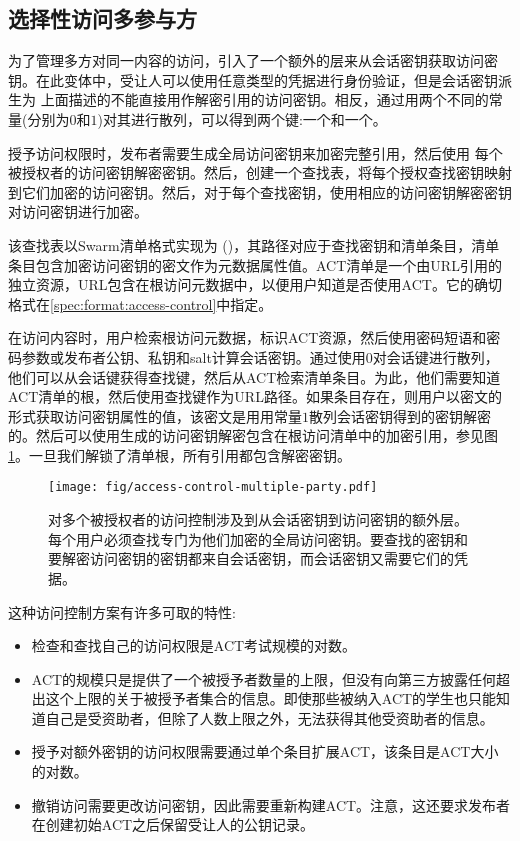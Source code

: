 \subsection{选择性访问多参与方\statusgreen}

为了管理多方对同一内容的访问，引入了一个额外的层来从会话密钥获取访问密钥。在此变体中，受让人可以使用任意类型的凭据进行身份验证，但是会话密钥派生为
上面描述的不能直接用作解密引用的访问密钥。相反，通过用两个不同的常量(分别为$0$和$1$)对其进行散列，可以得到两个键:一个和一个。

授予访问权限时，发布者需要生成全局访问密钥来加密完整引用，然后使用
每个被授权者的访问密钥解密密钥。然后，创建一个查找表，将每个授权查找密钥映射到它们加密的访问密钥。然后，对于每个查找密钥，使用相应的访问密钥解密密钥对访问密钥进行加密。

该查找表以Swarm清单格式实现为 ()，其路径对应于查找密钥和清单条目，清单条目包含加密访问密钥的密文作为元数据属性值。ACT清单是一个由URL引用的独立资源，URL包含在根访问元数据中，以便用户知道是否使用ACT。它的确切格式在\ref{spec:format:access-control}中指定。

在访问内容时，用户检索根访问元数据，标识ACT资源，然后使用密码短语和密码参数或发布者公钥、私钥和salt计算会话密钥。通过使用$0$对会话键进行散列，他们可以从会话键获得查找键，然后从ACT检索清单条目。为此，他们需要知道ACT清单的根，然后使用查找键作为URL路径。如果条目存在，则用户以密文的形式获取访问密钥属性的值，该密文是用用常量$1$散列会话密钥得到的密钥解密的。然后可以使用生成的访问密钥解密包含在根访问清单中的加密引用，参见图\ref{fig:access-control-multiple-party}。一旦我们解锁了清单根，所有引用都包含解密密钥。

\begin{figure}[htbp]
\centering
\texttt{[image: fig/access-control-multiple-party.pdf]}
\caption[对多个被授权的访问控制\statusyellow]{对多个被授权者的访问控制涉及到从会话密钥到访问密钥的额外层。每个用户必须查找专门为他们加密的全局访问密钥。要查找的密钥和要解密访问密钥的密钥都来自会话密钥，而会话密钥又需要它们的凭据。} 
\label{fig:access-control-multiple-party}
\end{figure}


这种访问控制方案有许多可取的特性:
\begin{itemize}
\item 检查和查找自己的访问权限是ACT考试规模的对数。
\item ACT的规模只是提供了一个被授予者数量的上限，但没有向第三方披露任何超出这个上限的关于被授予者集合的信息。即使那些被纳入ACT的学生也只能知道自己是受资助者，但除了人数上限之外，无法获得其他受资助者的信息。
\item 授予对额外密钥的访问权限需要通过单个条目扩展ACT，该条目是ACT大小的对数。 
\item 撤销访问需要更改访问密钥，因此需要重新构建ACT。注意，这还要求发布者在创建初始ACT之后保留受让人的公钥记录。
\end{itemize}


